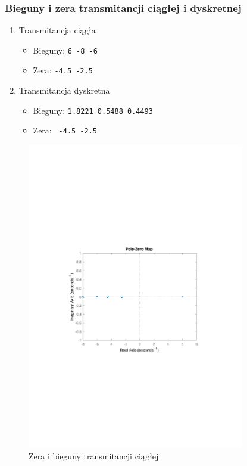 \documentclass{article}
\begin{document}
\subsubsection[Bieguny i zera]{Bieguny i zera transmitancji ciągłej i dyskretnej}
\begin{enumerate}
\item Transmitancja ciągła
\begin{itemize}
\item Bieguny: \verb+6 -8 -6+
\item Zera: \verb+-4.5 -2.5+
\end{itemize}

\item Transmitancja dyskretna
\begin{itemize}
\item Bieguny: \verb+1.8221 0.5488 0.4493+
\item Zera: \verb+ -4.5 -2.5+
\end{itemize}
\end{enumerate}
\begin{figure}[t]
\centering
\includegraphics[clip, trim=3cm 9cm 3cm 9.5cm, width=9.5cm]{../rys/zad1_rys1.pdf}
\caption{Zera i bieguny transmitancji ciągłej}
\label{fig:rys 1}
\end{figure}
\end{document}
